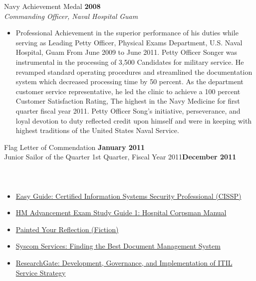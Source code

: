 \documentclass[a4papper,overlapped,line]{res}
\newcommand{\osection}[1]{\section{\sc {\color{MidnightBlue}\vspace{-0.60cm} \textbf{#1}\\}}}
\begin{document}
\begin{resume}
\begin{itemize}
\end{itemize}
Navy Achievement Medal \hfill \textbf{2008} \\
\textit{Commanding Officer, Naval Hospital Guam}
\begin{itemize}
	\item Professional Achievement in the superior performance of his duties while serving as Leading Petty Officer, Physical Exams Department, U.S. Naval Hospital, Guam From June 2009 to June 2011. Petty Officer Songer was instrumental in the processing of 3,500 Candidates for military service. He revamped standard operating procedures and streamlined the documentation system which decreased processing time by 50 percent. As the department customer service representative, he led the clinic to achieve a 100 percent Customer Satisfaction Rating, The highest in the Navy Medicine for first quarter fiscal year 2011. Petty Officer Song's initiative, perseverance, and loyal devotion to duty reflected credit upon himself and were in keeping with highest traditions of the United States Naval Service.
\end{itemize}
Flag Letter of Commendation \hfill  \textbf{January 2011} \\
Junior Sailor of the Quarter 1st Quarter, Fiscal Year 2011\hfill \textbf{December 2011} \\
\\
\osection{Publications}
\begin{itemize}
	\item \href{http://www.amazon.com/Easy-Guide-Certified-Information-Professional/dp/1507730101/ref=sr_1_1?s=books&ie=UTF8&qid=1453409299&sr=1-1&keywords=Austin+Songer}{Easy Guide: Certified Information Systems Security Professional (CISSP)}
	\item \href{http://www.amazon.com/HM-Advancement-Exam-Study-Guide/dp/149964521X/ref=sr_1_3?s=books&ie=UTF8&qid=1453409580&sr=1-3&keywords=Austin+Songer}{HM Advancement Exam Study Guide 1: Hospital Corpsman Manual}
	\item \href{http://www.barnesandnoble.com/w/painted-your-reflection-austin-v-songer/1117442341?ean=9781493744466#productInfoTabs}{Painted Your Reflection (Fiction)}
	\item \href{http://blog.syscomservices.com/document-technology/tips-for-finding-the-best-document-management-system}{Syscom Services: Finding the Best Document Management System}
	\item \href{https://www.researchgate.net/publication/289375497_Development_Governance_and_Implementation_of_ITIL_Service_Strategy}{ResearchGate: Development, Governance, and Implementation of ITIL Service Strategy}

\end{itemize}
\end{resume}
\end{document}
